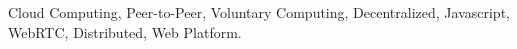 
% 
% 

\begin{keywords}
Cloud Computing, Peer-to-Peer, Voluntary Computing, Decentralized, Javascript, WebRTC, Distributed, Web Platform.
\end{keywords}
